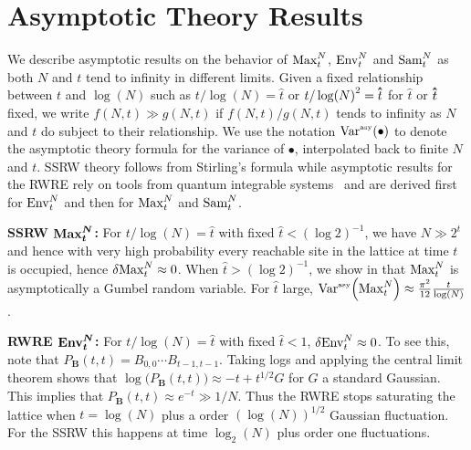 \section{Asymptotic Theory Results}
We describe asymptotic results on the behavior of $\mathrm{Max}^{N}_t$, $\mathrm{Env}^{N}_t$ and $\mathrm{Sam}^{N}_t$ as both $N$ and $t$ tend to infinity in different limits. Given a fixed relationship between $t$ and $\log(N)$ such as $t/\log(N)=\hat{t}$ or  $t/\log(N)^2=\hathat{t}$ for $\hat{t}$ or $\hathat{t}$ fixed, we write $f(N,t)\gg g(N,t)$ if $f(N,t)/g(N,t)$ tends to infinity as $N$ and $t$ do subject to their relationship. We use the notation $\mathrm{Var}^{\textrm{\tiny{asy}}}\!\left(\bullet\right)$ to denote the asymptotic theory formula for the variance of $\bullet$, interpolated back to finite $N$ and $t$. SSRW theory follows from Stirling's formula while asymptotic results for the RWRE rely on tools from quantum integrable systems~\cite{barraquandRandomwalkBetadistributedRandom2017a, barraquandModerateDeviationsDiffusion2020a,krajenbrinkCrossoverMacroscopicFluctuation2022} and are derived first for $\mathrm{Env}^{N}_t$ and then for $\mathrm{Max}^{N}_t$ and $\mathrm{Sam}^{N}_t$.

\noindent\textbf{SSRW $\boldsymbol{\mathrm{Max}^{N}_t}$:}
For $t/\log(N)=\hat{t}$ with fixed $\hat{t} < (\log 2)^{-1}$, we have $N\gg 2^t$ and hence with very high probability every reachable site in the lattice at time $t$ is occupied, hence $\var{\mathrm{Max}^{N}_t}\approx 0$. When $\hat{t} > (\log 2)^{-1}$, we show  in \cite{SeeSupplementalMaterial} that $\mathrm{Max}^{N}_t$ is asymptotically a Gumbel random variable. For $\hat{t}$ large, $\mathrm{Var}^{\textrm{\tiny{asy}}}\!\left(\mathrm{Max}^{N}_t\right) \approx \frac{\pi^2}{12} \frac{t}{\log(N)}$.


\noindent\textbf{RWRE $\boldsymbol{\mathrm{Env}^{N}_t}$:}
For $t/\log(N)=\hat{t}$ with fixed $\hat{t}<1$, $\var{\mathrm{Env}^{N}_t}\approx 0$. To see this, note that $P_\mathbf{B}(t,t) = B_{0,0} \cdots B_{t-1,t-1}$. Taking logs and applying the central limit theorem shows that $\log \big(P_\mathbf{B}(t,t)\big) \approx -t  + t^{1/2} G$ for $G$ a standard Gaussian. This implies that $P_\mathbf{B}(t,t) \approx e^{-t}\gg 1/N$. Thus the RWRE stops saturating the lattice when $t= \log(N)$ plus a order $(\log(N))^{1/2}$ Gaussian fluctuation. For the SSRW this happens at time $\log_2(N)$ plus order one fluctuations.


